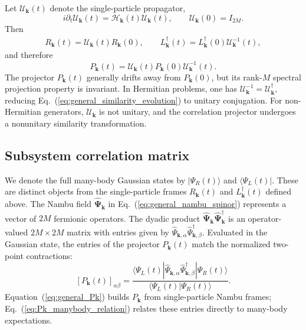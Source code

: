 \documentclass[aps,prb,reprint,superscriptaddress,amsmath,amssymb,floatfix]{revtex4-2}
\begin{document}
Let $\mathcal U_{\bm k}(t)$ denote the single-particle propagator,
\begin{equation}
i\partial_t\mathcal U_{\bm k}(t) = \mathcal H_{\bm k}(t)\mathcal U_{\bm k}(t), \qquad \mathcal U_{\bm k}(0)=I_{2M}.
\label{eq:general_propagator}
\end{equation}
Then
\begin{equation}
\begin{aligned}
R_{\bm k}(t) = \mathcal U_{\bm k}(t)R_{\bm k}(0), \qquad L_{\bm k}^{\dagger}(t) = L_{\bm k}^{\dagger}(0)\mathcal U_{\bm k}^{-1}(t),
\end{aligned} \label{eq:general_frames_propagator}
\end{equation}
and therefore
\begin{equation}
P_{\bm k}(t) = \mathcal U_{\bm k}(t) P_{\bm k}(0) \mathcal U_{\bm k}^{-1}(t).
\label{eq:general_similarity_evolution}
\end{equation}
The projector $P_{\bm k}(t)$ generally drifts away from $P_{\bm k}(0)$, but its rank-$M$ spectral projection property is invariant. In Hermitian problems, one has $\mathcal U_{\bm k}^{-1}=\mathcal U_{\bm k}^{\dagger}$, reducing Eq.~(\ref{eq:general_similarity_evolution}) to unitary conjugation. For non-Hermitian generators, $\mathcal U_{\bm k}$ is not unitary, and the correlation projector undergoes a nonunitary similarity transformation.

\subsection{Subsystem correlation matrix}

We denote the full many-body Gaussian states by $\vert{}\Psi_R(t)\rangle$ and $\langle\Psi_L(t)\vert{}$. These are distinct objects from the single-particle frames $R_{\bm k}(t)$ and $L_{\bm k}^{\dagger}(t)$ defined above.
%
  The Nambu field $\hat{\bm\Psi}_{\bm k}$ in Eq.~(\ref{eq:general_nambu_spinor}) represents a vector of $2M$ fermionic operators. The dyadic product $\hat{\bm\Psi}_{\bm k}\hat{\bm\Psi}_{\bm k}^{\dagger}$ is an operator-valued $2M\times2M$ matrix with entries given by $\hat\Psi_{\bm k,\alpha}\hat\Psi_{\bm k,\beta}^{\dagger}$. Evaluated in the Gaussian state, the entries of the projector $P_{\bm k}(t)$ match the normalized two-point contractions:
\begin{equation}
\left[P_{\bm k}(t)\right]_{\alpha\beta} = \frac{ \langle\Psi_L(t)| \hat\Psi_{\bm k,\alpha} \hat\Psi_{\bm k,\beta}^{\dagger} |\Psi_R(t)\rangle }{ \langle\Psi_L(t)|\Psi_R(t)\rangle }.
\label{eq:Pk_manybody_relation}
\end{equation}
Equation~(\ref{eq:general_Pk}) builds $P_{\bm k}$ from single-particle Nambu frames; Eq.~(\ref{eq:Pk_manybody_relation}) relates these entries directly to many-body expectations.
\end{document}
